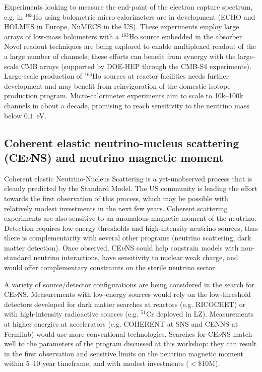 Experiments looking to measure the end-point of the electron capture
spectrum, e.g. in $^{163}$Ho using bolometric micro-calorimeters are
in development (ECHO and HOLMES in Europe, NuMECS in the US). These
experiments employ large arrays of low-mass bolometers with a
$^{163}$Ho source embedded in the absorber. Novel readout techniques
are being explored to enable multiplexed readout of the a large number
of channels; these efforts can benefit from synergy with the
large-scale CMB arrays (supported by DOE-HEP through the CMB-S4
experiments). Large-scale production of $^{163}$Ho sources at reactor
facilities needs further  development and may benefit from
reinvigoration of the domestic isotope production program. 
Micro-calorimeter experiments aim to scale to 10k--100k
channels in about a decade, promising to reach sensitivity to the
neutrino mass below $0.1$~eV.


\subsection{Coherent elastic neutrino-nucleus scattering (CE$\nu$NS)
  and neutrino magnetic moment}

Coherent elastic Neutrino-Nucleus Scattering is a yet-unobserved
process that is cleanly predicted by the Standard Model.  The US
community is leading the effort towards the first observation of this
process, which may be possible with relatively modest investments in
the next few years. Coherent scattering experiments are also
sensitive to an anomalous magnetic moment of the neutrino. Detection
requires low energy thresholds and high-intensity neutrino sources,
thus there is complementarity with several other programs (neutrino
scattering, dark matter detection). Once observed, CE$\nu$NS could help
constrain models with non-standard neutrino interactions, have
sensitivity to nuclear weak charge, and would offer complementary
constraints on the sterile neutrino sector. 

A variety of source/detector configurations are being considered in the
search for CE$\nu$NS. Measurements with low-energy sources would rely
on the low-threshold detectors developed for dark matter searches at
reactors (e.g. RICOCHET) or with high-intensity radioactive
sources (e.g. $^{51}$Cr deployed in LZ). Measurements at higher
energies at accelerators (e.g. COHERENT at SNS and CENNS at Fermilab)
would use more conventional technologies. Searches for CE$\nu$NS match
well to the parameters of the program discussed at this workshop: they
can result in the first observation and sensitive limits on the
neutrino magnetic moment within 5--10 year timeframe, and with modest
investments ($<$\$10M). 

